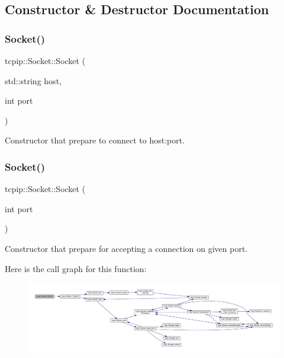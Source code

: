 \subsection{Constructor \& Destructor Documentation}
\mbox{\label{classtcpip_1_1_socket_adcf673cc4a6e4183f4a6f0929e13c5c1}} 
\subsubsection{\texorpdfstring{Socket()}{Socket()}\hspace{0.1cm}{\footnotesize\ttfamily [1/2]}}
{\footnotesize\ttfamily tcpip\+::\+Socket\+::\+Socket (\begin{DoxyParamCaption}\item[{std\+::string}]{host,  }\item[{int}]{port }\end{DoxyParamCaption})}



Constructor that prepare to connect to host\+:port. 

\mbox{\label{classtcpip_1_1_socket_af92b0e4bfc335b36971e94baa19fa017}} 
\subsubsection{\texorpdfstring{Socket()}{Socket()}\hspace{0.1cm}{\footnotesize\ttfamily [2/2]}}
{\footnotesize\ttfamily tcpip\+::\+Socket\+::\+Socket (\begin{DoxyParamCaption}\item[{int}]{port }\end{DoxyParamCaption})}



Constructor that prepare for accepting a connection on given port. 

Here is the call graph for this function\+:\nopagebreak
\begin{figure}[H]
\begin{center}
\leavevmode
\includegraphics[width=350pt]{classtcpip_1_1_socket_af92b0e4bfc335b36971e94baa19fa017_cgraph}
\end{center}
\end{figure}
\mbox{\label{classtcpip_1_1_socket_a610c213f4b2fad07cc0bfddc3a5577e4}} 
